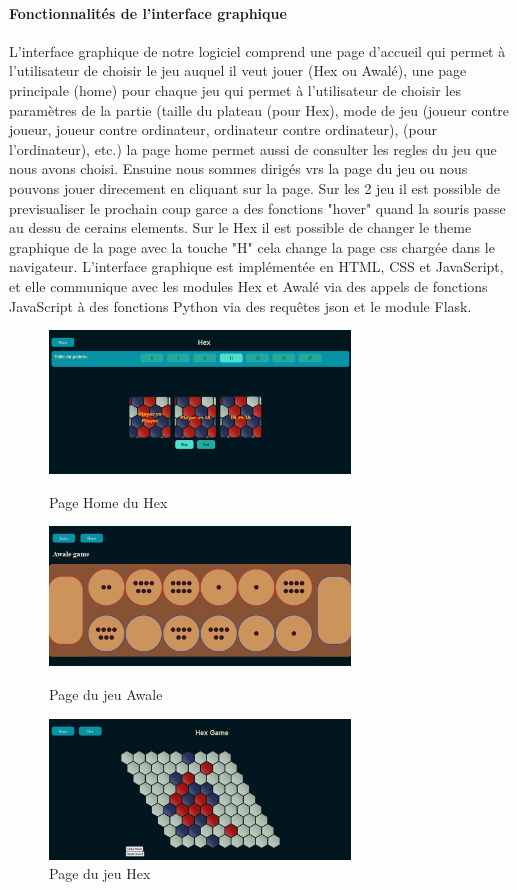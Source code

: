 \paragraph{Fonctionnalités de l'interface graphique}
L'interface graphique de notre logiciel comprend une page d'accueil qui permet à l'utilisateur
de choisir le jeu auquel il veut jouer (Hex ou Awalé), une page principale (home) pour chaque jeu
qui permet à l'utilisateur de choisir les paramètres de la partie (taille du plateau (pour Hex),
mode de jeu (joueur contre joueur, joueur contre ordinateur, ordinateur contre ordinateur),
(pour l'ordinateur), etc.) la page home permet aussi de consulter les regles du jeu que nous avons choisi.
Ensuine nous sommes dirigés vrs la page du jeu ou nous pouvons jouer direcement en cliquant sur la page.
Sur les 2 jeu il est possible de previsualiser le prochain coup garce a des fonctions "hover" quand la souris passe
au dessu de cerains elements.
Sur le Hex il est possible de changer le theme graphique de la page avec la touche "H" cela change la page css chargée dans le navigateur.
L'interface graphique est implémentée en HTML, CSS et JavaScript, et
elle communique avec les modules Hex et Awalé via des appels de fonctions JavaScript à des
fonctions Python via des requêtes json et le module Flask.

\begin{figure}[h]
    \centering
    \includegraphics[width=8cm]{root/exemple_home.png}
    \caption{Page Home du Hex}
    \label{fig:exemple_home.png}

    \includegraphics[width=8cm]{root/awale_board.png}
    \caption{Page du jeu Awale}
    \label{fig:awale_board.png}

    \includegraphics[width=8cm]{root/exemple_partie_hex.png}
    \caption{Page du jeu Hex}
    \label{fig:exemple_partie_hex.png}
\end{figure}

